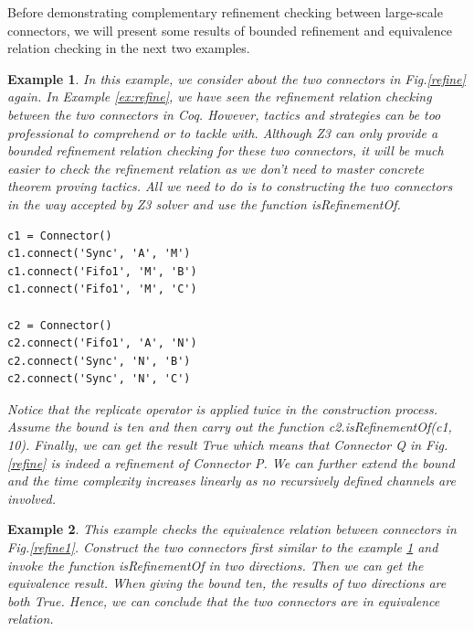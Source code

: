 \documentclass[3p,times]{elsarticle}
\newtheorem{example}{Example}[section]
\begin{document}
Before demonstrating complementary refinement checking between large-scale connectors, we will present some results of bounded refinement and equivalence relation checking in the next two examples.
\begin{example}
\label{ex:equivalence1}
In this example, we consider about the two connectors in Fig.\ref{refine} again. In  Example \ref{ex:refine}, we have seen the refinement relation checking between the two connectors in Coq. However, tactics and strategies can be too professional to comprehend or to tackle with. Although Z3 can only provide a bounded refinement relation checking for these two connectors, it will be much easier to check the refinement relation as we don't need to master concrete theorem proving tactics. All we need to do is to constructing the two connectors in the way accepted by Z3 solver and use the function \emph{isRefinementOf}.
\begin{lstlisting}[frame=single]
c1 = Connector()
c1.connect('Sync', 'A', 'M')
c1.connect('Fifo1', 'M', 'B')
c1.connect('Fifo1', 'M', 'C')

c2 = Connector()
c2.connect('Fifo1', 'A', 'N')
c2.connect('Sync', 'N', 'B')
c2.connect('Sync', 'N', 'C')
\end{lstlisting}
Notice that the \emph{replicate} operator is applied twice in the construction process. Assume the bound is ten and then carry out the function \emph{c2.isRefinementOf(c1, 10)}. Finally, we can get the result \emph{True} which means that \emph{Connector Q} in Fig.\ref{refine} is indeed a refinement of \emph{Connector P}. We can further extend the bound and the time complexity increases linearly as no recursively defined channels are involved.
\end{example}
\begin{example}
This example checks the equivalence relation between connectors in Fig.\ref{refine1}. Construct the two connectors first similar to the example \ref{ex:equivalence1} and invoke the function \emph{isRefinementOf} in two directions. Then we can get the equivalence result.
When giving the bound ten, the results of two directions are both \emph{True}. Hence, we can conclude that the two connectors are in equivalence relation.
\end{example}
\end{document}
